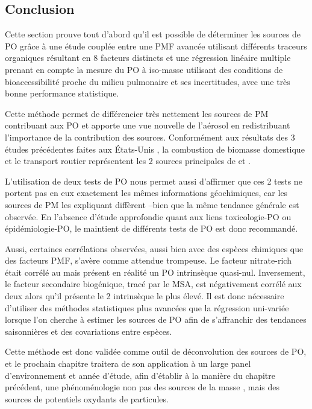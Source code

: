 \clearpage


\subsection{Conclusion}

Cette section prouve tout d'abord qu'il est possible de déterminer les sources de PO grâce à
une étude couplée entre une PMF avancée utilisant différents traceurs organiques résultant
en 8 facteurs distincts et une régression linéaire multiple prenant en compte
la mesure du PO à iso-masse utilisant des conditions de bioaccessibilité proche du milieu
pulmonaire et ses incertitudes, avec une très bonne performance statistique.

Cette méthode permet de différencier très nettement les sources de PM contribuant aux PO
et apporte une vue nouvelle de l'aérosol en redistribuant l'importance de la contribution
des sources. Conformément aux résultats des 3 études précédentes faites aux États-Unis
\autocite{vermaReactive2014,batesReactive2015,fangOxidative2016}, la combustion de
biomasse domestique et le transport routier représentent les 2 sources principales de
\POAAv{} et \PODTTv.

L'utilisation de deux tests de PO nous permet aussi d'affirmer que ces 2 tests ne portent
pas en eux exactement les mêmes informations géochimiques, car les sources de PM les
expliquant diffèrent --bien que la même tendance générale est observée. En l'absence
d'étude approfondie quant aux liens toxicologie-PO ou épidémiologie-PO, le maintient de
différents tests de PO est donc recommandé.

Aussi, certaines corrélations observées, aussi bien avec des espèces chimiques que des
facteurs PMF, s'avère comme attendue trompeuse. Le facteur nitrate-rich était corrélé au
\POAAv{} mais présent en réalité un PO intrinsèque quasi-nul. Inversement, le facteur
secondaire biogénique, tracé par le MSA, est négativement corrélé aux deux \OPv{} alors
qu'il présente le 2\ieme{} \PODTT{} intrinsèque le plus élevé. Il est donc nécessaire
d'utiliser des méthodes statistiques plus avancées que la régression uni-variée lorsque
l'on cherche à estimer les sources de PO afin de s'affranchir des tendances saisonnières et
des covariations entre espèces.

Cette méthode est donc validée comme outil de déconvolution des sources de PO, et le
prochain chapitre traitera de son application à un large panel d'environnement et année
d'étude, afin d'établir à la manière du chapitre précédent, une phénoménologie non pas des
sources de la masse \PMdix, mais des sources de potentiels oxydants de particules.


